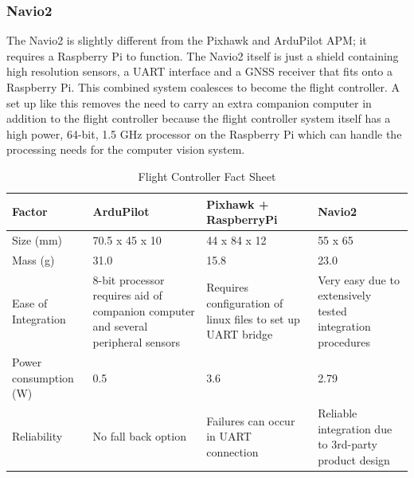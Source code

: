 		\subsubsection{Navio2}
			The Navio2 is slightly different from the Pixhawk and ArduPilot APM; it requires a Raspberry Pi to function. The Navio2 itself is just a shield containing high resolution sensors, a UART interface and a GNSS receiver that fits onto a Raspberry Pi. This combined system coalesces to become the flight controller. A set up like this removes the need to carry an extra companion computer in addition to the flight controller because the flight controller system itself has a high power, 64-bit, 1.5 GHz processor on the Raspberry Pi which can handle the processing needs for the computer vision system.

 \begin{table}[H]
            \centering
            \caption{Flight Controller Fact Sheet}
            \label{tab: flight controller}
            \begin{tabularx}{1\linewidth}{X X X X}
                \toprule
                Factor & ArduPilot & Pixhawk + RaspberryPi & Navio2 \\
               \midrule
                Size (mm) & 70.5 x 45 x 10 & 44 x 84 x 12 & 55 x 65 \\
                Mass (g) & 31.0 & 15.8 & 23.0 \\
                Ease of Integration & 8-bit processor requires aid of companion \mbox{computer} and several peripheral sensors & Requires configuration of linux files to set up UART bridge & Very easy due to extensively tested integration procedures\\
                Power \newline consumption (W) & 0.5 & 3.6 & 2.79 \\
                Reliability & No fall back option & Failures can occur in UART connection & Reliable integration due to 3rd-party product \mbox{design} \\
                \bottomrule
            \end{tabularx}
        \end{table}
        
